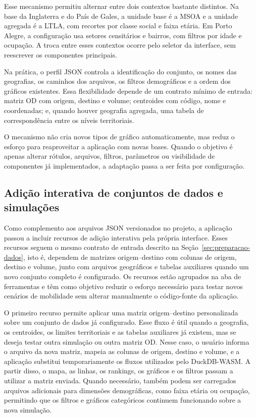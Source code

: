 \documentclass[12pt]{article}
\begin{document}
Esse mecanismo permitiu alternar entre dois contextos bastante distintos. Na base da Inglaterra e do País de Gales, a unidade base é a MSOA e a unidade agregada é a LTLA, com recortes por classe social e faixa etária. Em Porto Alegre, a configuração usa setores censitários e bairros, com filtros por idade e ocupação. A troca entre esses contextos ocorre pelo seletor da interface, sem reescrever os componentes principais.

Na prática, o perfil JSON controla a identificação do conjunto, os nomes das geografias, os caminhos dos arquivos, os filtros demográficos e a ordem dos gráficos existentes. Essa flexibilidade depende de um contrato mínimo de entrada: matriz OD com origem, destino e volume; centroides com código, nome e coordenadas; e, quando houver geografia agregada, uma tabela de correspondência entre os níveis territoriais.

O mecanismo não cria novos tipos de gráfico automaticamente, mas reduz o esforço para reaproveitar a aplicação com novas bases. Quando o objetivo é apenas alterar rótulos, arquivos, filtros, parâmetros ou visibilidade de componentes já implementados, a adaptação passa a ser feita por configuração.

\subsection{Adição interativa de conjuntos de dados e simulações}

Como complemento aos arquivos JSON versionados no projeto, a aplicação passou a incluir recursos de adição interativa pela própria interface. Esses recursos seguem o mesmo contrato de entrada descrito na Seção~\ref{sec:preparacao-dados}, isto é, dependem de matrizes origem--destino com colunas de origem, destino e volume, junto com arquivos geográficos e tabelas auxiliares quando um novo conjunto completo é configurado. Os recursos estão agrupados na aba de ferramentas e têm como objetivo reduzir o esforço necessário para testar novos cenários de mobilidade sem alterar manualmente o código-fonte da aplicação.

O primeiro recurso permite aplicar uma matriz origem--destino personalizada sobre um conjunto de dados já configurado. Esse fluxo é útil quando a geografia, os centroides, os limites territoriais e as tabelas auxiliares já existem, mas se deseja testar outra simulação ou outra matriz OD. Nesse caso, o usuário informa o arquivo da nova matriz, mapeia as colunas de origem, destino e volume, e a aplicação substitui temporariamente os fluxos utilizados pelo DuckDB-WASM. A partir disso, o mapa, as linhas, os rankings, os gráficos e os filtros passam a utilizar a matriz enviada. Quando necessário, também podem ser carregados arquivos adicionais para dimensões demográficas, como faixa etária ou ocupação, permitindo que os filtros e gráficos categóricos continuem funcionando sobre a nova simulação.
\end{document}
